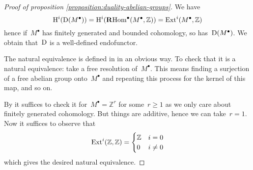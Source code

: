 \documentclass[10pt,a4paper]{article}
\begin{document}
\begin{proof}[Proof of proposition \ref{proposition:duality-abelian-groups}]
  We have
  \begin{equation}
    \operatorname{H}^i(\operatorname{D}(M^\bullet))=\operatorname{H}^i(\operatorname{\mathbf{R}Hom}^\bullet(M^\bullet,\mathbb{Z}))=\operatorname{Ext}^i(M^\bullet,\mathbb{Z})
  \end{equation}
  hence if~$M^\bullet$ has finitely generated and bounded cohomology, so has~$\operatorname{D}(M^\bullet)$. We obtain that~$\operatorname{D}$ is a well-defined endofunctor.

  The natural equivalence is defined in \cite[lemma V.1.2]{hartshorne-residues-and-duality} in an obvious way. To check that it is a natural equivalence: take a free resolution of~$M^\bullet$. This means finding a surjection of a free abelian group onto~$M^\bullet$ and repeating this process for the kernel of this map, and so on.
  
  By \cite[lemma I.7.1]{hartshorne-residues-and-duality} it suffices to check it for~$M^\bullet=\mathbb{Z}^r$ for some~$r\geq 1$ as we only care about finitely generated cohomology. But things are additive, hence we can take~$r=1$. Now it suffices to observe that
  \begin{equation}
    \operatorname{Ext}^i(\mathbb{Z},\mathbb{Z})=
    \begin{cases}
      \mathbb{Z} & i=0 \\
      0 & i\neq 0
    \end{cases}
  \end{equation}
  which gives the desired natural equivalence.
\end{proof}
\end{document}
